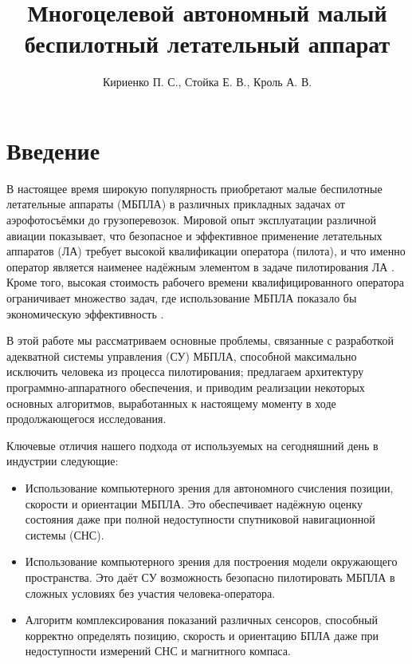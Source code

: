 \documentclass[12pt,a4paper]{article}
\title{Многоцелевой автономный малый беспилотный летательный аппарат}
\author{Кириенко П. С., Стойка Е. В., Кроль А. В.}
\affil{Zubax Robotics, г. Москва}
\date{}
\begin{document}

\maketitle

\section{Введение}

В настоящее время широкую популярность приобретают малые беспилотные летательные аппараты (МБПЛА) в различных прикладных задачах от аэрофотосъёмки до грузоперевозок. Мировой опыт эксплуатации различной авиации показывает, что безопасное и эффективное применение летательных аппаратов (ЛА) требует высокой квалификации оператора (пилота), и что именно оператор является наименее надёжным элементом в задаче пилотирования ЛА \cite{RiskManagementHandbookFAA, PlaneCrashInfo, HumanFactorsBoeing}. Кроме того, высокая стоимость рабочего времени квалифицированного оператора ограничивает множество задач, где использование МБПЛА показало бы экономическую эффективность \cite{DroneHire}.

В этой работе мы рассматриваем основные проблемы, связанные с разработкой адекватной системы управления (СУ) МБПЛА, способной максимально исключить человека из процесса пилотирования; предлагаем архитектуру программно-аппаратного обеспечения, и приводим реализации некоторых основных алгоритмов, выработанных к настоящему моменту в ходе продолжающегося исследования.

Ключевые отличия нашего подхода от используемых на сегодняшний день в индустрии следующие:

\begin{itemize}
    \item Использование компьютерного зрения для автономного счисления позиции, скорости и ориентации МБПЛА. Это обеспечивает надёжную оценку состояния даже при полной недоступности спутниковой навигационной системы (СНС).
    \item Использование компьютерного зрения для построения модели окружающего пространства. Это даёт СУ возможность безопасно пилотировать МБПЛА в сложных условиях без участия человека-оператора.
    \item Алгоритм комплексирования показаний различных сенсоров, способный корректно определять позицию, скорость и ориентацию БПЛА даже при недоступности измерений СНС и магнитного компаса.
\end{itemize}
\end{document}

